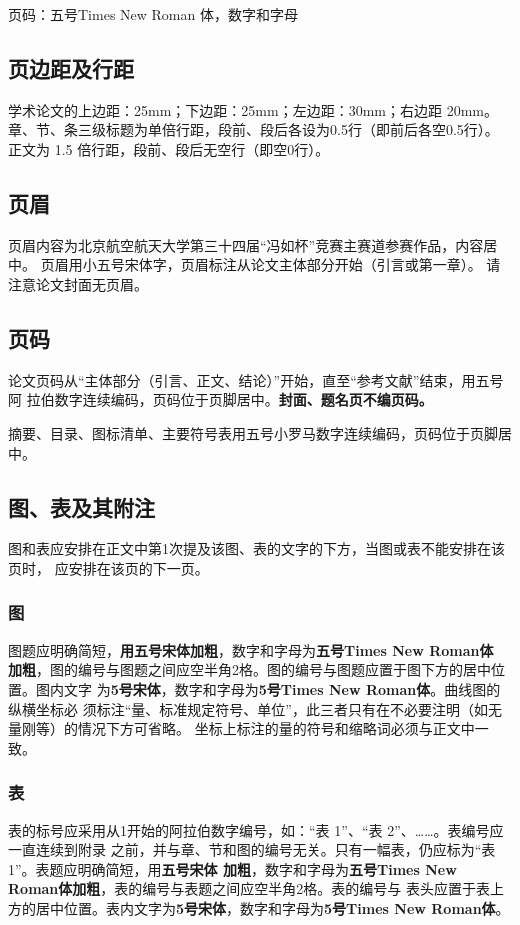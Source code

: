 \documentclass[zihao=-4]{ctexart}
\begin{document}
\begin{spacing}{1.5}
页码：五号Times New Roman 体，数字和字母\par

\subsection{页边距及行距}
学术论文的上边距：25mm；下边距：25mm；左边距：30mm；右边距 20mm。
章、节、条三级标题为单倍行距，段前、段后各设为0.5行（即前后各空0.5行）。
正文为 1.5 倍行距，段前、段后无空行（即空0行）。

\subsection{页眉}
页眉内容为北京航空航天大学第三十四届“冯如杯”竞赛主赛道参赛作品，内容居中。
页眉用小五号宋体字，页眉标注从论文主体部分开始（引言或第一章）。
请注意论文封面无页眉。

\subsection{页码}
论文页码从“主体部分（引言、正文、结论）”开始，直至“参考文献”结束，用五号阿
拉伯数字连续编码，页码位于页脚居中。\textbf{封面、题名页不编页码。}

摘要、目录、图标清单、主要符号表用五号小罗马数字连续编码，页码位于页脚居中。

\subsection{图、表及其附注}
图和表应安排在正文中第1次提及该图、表的文字的下方，当图或表不能安排在该页时，
应安排在该页的下一页。

\subsubsection{图}
图题应明确简短，\textbf{用五号宋体加粗}，数字和字母为\textbf{五号Times New Roman体
加粗}，图的编号与图题之间应空半角2格。图的编号与图题应置于图下方的居中位置。图内文字
为\textbf{5号宋体}，数字和字母为\textbf{5号Times New Roman体}。曲线图的纵横坐标必
须标注“量、标准规定符号、单位”，此三者只有在不必要注明（如无量刚等）的情况下方可省略。
坐标上标注的量的符号和缩略词必须与正文中一致。

\subsubsection{表}
表的标号应采用从1开始的阿拉伯数字编号，如：“表 1”、“表 2”、……。表编号应一直连续到附录
之前，并与章、节和图的编号无关。只有一幅表，仍应标为“表 1”。表题应明确简短，用\textbf{五号宋体
加粗}，数字和字母为\textbf{五号Times New Roman体加粗}，表的编号与表题之间应空半角2格。表的编号与
表头应置于表上方的居中位置。表内文字为\textbf{5号宋体}，数字和字母为\textbf{5号Times New Roman体}。  


\end{spacing}
\end{document}

